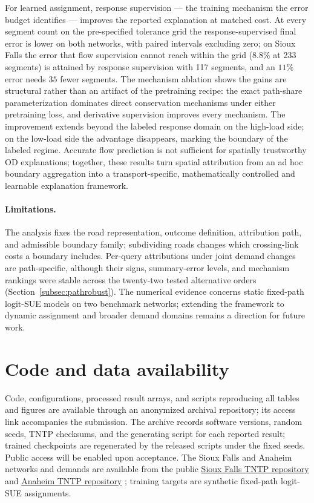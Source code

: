 \documentclass[a4paper,fleqn]{cas-sc}
\begin{document}
For learned assignment, response supervision --- the training mechanism
the error budget identifies --- improves the reported explanation at
matched cost. At every segment count on the pre-specified tolerance
grid the response-supervised final error is lower on both networks,
with paired intervals excluding zero; on Sioux Falls the error that
flow supervision cannot reach within the grid ($8.8\%$ at 233 segments)
is attained by response supervision with 117 segments, and an $11\%$
error needs $35$ fewer segments. The mechanism ablation shows the gains
are structural rather than an artifact of the pretraining recipe: the
exact path-share parameterization dominates direct conservation
mechanisms under either pretraining loss, and derivative supervision
improves every mechanism. The improvement extends beyond the labeled
response domain on the high-load side; on the low-load side the
advantage disappears, marking the boundary of the labeled regime.
Accurate flow prediction is not sufficient for spatially trustworthy
OD explanations; together, these results turn spatial attribution from
an ad hoc boundary aggregation into a transport-specific,
mathematically controlled and learnable explanation framework.

\paragraph{Limitations.}
The analysis fixes the road representation, outcome definition,
attribution path, and admissible boundary family; subdividing roads
changes which crossing-link costs a boundary includes. Per-query
attributions under joint demand changes are path-specific, although
their signs, summary-error levels, and mechanism rankings were stable
across the twenty-two tested alternative orders
(Section~\ref{subsec:pathrobust}). The numerical evidence concerns
static fixed-path logit-SUE models on two benchmark networks; extending
the framework to dynamic assignment and broader demand domains remains
a direction for future work.

\section*{Code and data availability}
Code, configurations, processed result arrays, and scripts reproducing
all tables and figures are available through an anonymized archival
repository; its access link accompanies the submission. The archive
records software versions, random seeds,
TNTP checksums, and the generating script for each reported result;
trained checkpoints are regenerated by the released scripts under the
fixed seeds. Public access will be enabled upon acceptance.
The Sioux Falls and Anaheim networks and demands are available from the public
\href{https://github.com/bstabler/TransportationNetworks/tree/master/SiouxFalls}{Sioux Falls TNTP repository}
and \href{https://github.com/bstabler/TransportationNetworks/tree/master/Anaheim}{Anaheim TNTP repository}
\citep{tnfrc2024transportation}; training targets are synthetic fixed-path
logit-SUE assignments.
\end{document}
